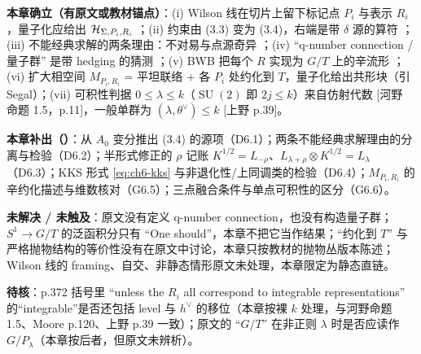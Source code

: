 \begin{boundary}
\textbf{本章确立（有原文或教材锚点）}：(i) Wilson 线在切片上留下标记点 $P_i$ 与表示 $R_i$，量子化应给出 $\mathcal{H}_{\Sigma,P_i,R_i}$ ；(ii) 约束由 (3.3) 变为 (3.4)，右端是带 $\delta$ 源的算符 ；(iii) 不能经典求解的两条理由：不对易与点源奇异 ；(iv) “q-number connection / 量子群” 是带 hedging 的猜测 ；(v) BWB 把每个 $R$ 实现为 $G/T$ 上的辛流形 ；(vi) 扩大相空间 $M_{P_i,R_i}$ = 平坦联络 + 各 $P_i$ 处约化到 $T$，量子化给出共形块（引 Segal）；(vii) 可积性判据 $0\le\lambda\le k$（$\operatorname{SU}(2)$ 即 $2j\le k$）来自仿射代数 [河野 命题 1.5，p.11]，一般单群为 $(\lambda,\theta^\vee)\le k$ [上野 p.39]。

\textbf{本章补出（\ours）}：从 $A_0$ 变分推出 (3.4) 的源项（D6.1）；两条不能经典求解理由的分离与检验（D6.2）；半形式修正的 $\rho$ 记账 $K^{1/2}=L_{-\rho}$、$L_{\lambda+\rho}\otimes K^{1/2}=L_\lambda$（D6.3）；KKS 形式 \eqref{eq:ch6-kks} 与非退化性/上同调类的检验（D6.4）；$M_{P_i,R_i}$ 的辛约化描述与维数核对（G6.5）；三点融合条件与单点可积性的区分（G6.6）。

\textbf{未解决 / 未触及}：原文没有定义 q-number connection，也没有构造量子群；$S^1\to G/T$ 的泛函积分只有 “One should”，本章不把它当作结果；“约化到 $T$” 与严格抛物结构的等价性没有在原文中讨论，本章只按教材的抛物丛版本陈述；Wilson 线的 framing、自交、非静态情形原文未处理，本章限定为静态直链。

\textbf{待核}：p.372 括号里 “unless the $R_i$ all correspond to integrable representations” 的“integrable”是否还包括 level 与 $h^\vee$ 的移位（本章按裸 $k$ 处理，与河野命题 1.5、Moore p.120、上野 p.39 一致）；原文的 “$G/T$” 在非正则 $\lambda$ 时是否应读作 $G/P_\lambda$（本章按后者，但原文未辨析）。
\end{boundary}



